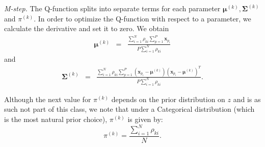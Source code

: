 \documentclass[a4paper,11pt]{article}
\def\x{\boldsymbol{x}}
\def\bmu{\boldsymbol{\mu}}
\def\bSigma{\boldsymbol{\Sigma}}
\begin{document}
{\it M-step.} The Q-function splits into separate terms for each parameter $\bmu^{(k)}, \bSigma^{(k)}$ and $\pi^{(k)}$. In order to optimize the Q-function with respect to a parameter, we calculate the derivative and set it to zero. We obtain
\begin{eqnarray*}
\bmu^{(k)} &=& \frac{\sum_{i=1}^N \rho_{ki} \sum_{p=1}^P \x_{p_i} }{P\sum_{i=1}^N \rho_{ki}}
\end{eqnarray*}
and
\begin{eqnarray*}
\bSigma^{(k)} &=& \frac{\sum_{i=1}^N \rho_{ki} \sum_{p=1}^P \left(\x_{p_i}-\bmu^{(k)}\right)\left(\x_{p_i}-\bmu^{(k)}\right)^T }{P\sum_{i=1}^N \rho_{ki}}.
\end{eqnarray*}

Although the next value for $\pi^{(k)}$ depends on the prior distribution on $z$ and is as such not part of this class, we note that under a Categorical distribution (which is the most natural prior choice), $\pi^{(k)}$ is given by:
\begin{equation*}
\pi^{(k)} = \frac{\sum_{i=1}^N \rho_{ki}}{N}.
\end{equation*}
\end{document}
